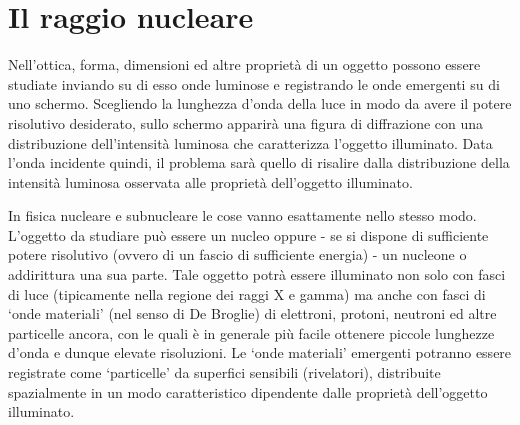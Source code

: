 \section{Il raggio nucleare}\label{sec:raggio-nucleare}
Nell'ottica, forma, dimensioni ed altre proprietà di un oggetto possono
essere studiate inviando su di esso onde luminose e registrando le onde
emergenti su di uno schermo. Scegliendo la lunghezza d'onda della luce
in modo da avere il potere risolutivo desiderato, sullo schermo apparirà
una figura di diffrazione con una distribuzione dell'intensità luminosa
che caratterizza l'oggetto illuminato. Data l'onda incidente quindi, il
problema sarà quello di risalire dalla distribuzione della intensità
luminosa osservata alle proprietà dell'oggetto illuminato.

In fisica nucleare e subnucleare le cose vanno esattamente nello stesso modo.
L’oggetto da studiare può essere un nucleo oppure - se si dispone di sufficiente potere risolutivo (ovvero di un fascio di sufficiente energia) - un nucleone o addirittura una sua parte.
Tale oggetto potrà essere illuminato non solo con fasci di luce (tipicamente nella regione dei raggi X e gamma) ma anche con fasci di ‘onde materiali’ (nel senso di De Broglie) di elettroni, protoni, neutroni ed altre particelle ancora, con le quali è in generale più facile ottenere piccole lunghezze d’onda e dunque elevate risoluzioni.
Le ‘onde materiali’ emergenti potranno essere registrate come ‘particelle’ da superfici sensibili (rivelatori), distribuite spazialmente in un modo caratteristico dipendente dalle proprietà dell’oggetto illuminato.

